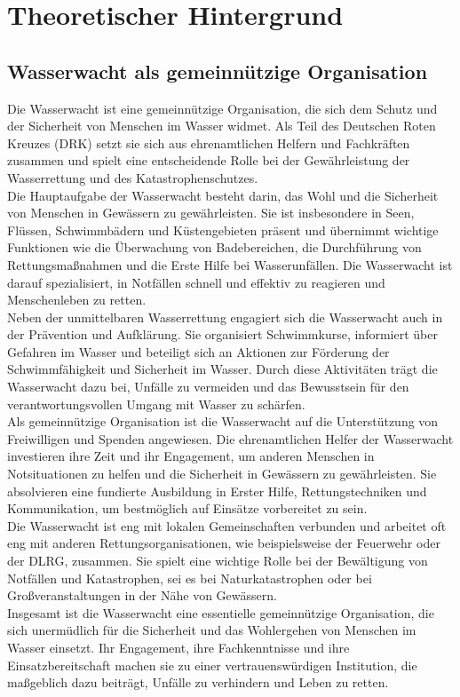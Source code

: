 \documentclass[fontsize=12pt,openright,oneside,paper=a4,BCOR=1cm]{scrbook}
\begin{document}
%
%

\chapter{Theoretischer Hintergrund}

\section{Wasserwacht als gemeinnützige Organisation}

Die Wasserwacht ist eine gemeinnützige Organisation, die sich dem Schutz und der Sicherheit von Menschen im Wasser widmet. Als Teil des Deutschen Roten Kreuzes (DRK) setzt sie sich aus ehrenamtlichen Helfern und Fachkräften zusammen und spielt eine entscheidende Rolle bei der Gewährleistung der Wasserrettung und des Katastrophenschutzes. \\
Die Hauptaufgabe der Wasserwacht besteht darin, das Wohl und die Sicherheit von Menschen in Gewässern zu gewährleisten. Sie ist insbesondere in Seen, Flüssen, Schwimmbädern und Küstengebieten präsent und übernimmt wichtige Funktionen wie die Überwachung von Badebereichen, die Durchführung von Rettungsmaßnahmen und die Erste Hilfe bei Wasserunfällen. Die Wasserwacht ist darauf spezialisiert, in Notfällen schnell und effektiv zu reagieren und Menschenleben zu retten. \\
Neben der unmittelbaren Wasserrettung engagiert sich die Wasserwacht auch in der Prävention und Aufklärung. Sie organisiert Schwimmkurse, informiert über Gefahren im Wasser und beteiligt sich an Aktionen zur Förderung der Schwimmfähigkeit und Sicherheit im Wasser. Durch diese Aktivitäten trägt die Wasserwacht dazu bei, Unfälle zu vermeiden und das Bewusstsein für den verantwortungsvollen Umgang mit Wasser zu schärfen. \\
Als gemeinnützige Organisation ist die Wasserwacht auf die Unterstützung von Freiwilligen und Spenden angewiesen. Die ehrenamtlichen Helfer der Wasserwacht investieren ihre Zeit und ihr Engagement, um anderen Menschen in Notsituationen zu helfen und die Sicherheit in Gewässern zu gewährleisten. Sie absolvieren eine fundierte Ausbildung in Erster Hilfe, Rettungstechniken und Kommunikation, um bestmöglich auf Einsätze vorbereitet zu sein. \\
Die Wasserwacht ist eng mit lokalen Gemeinschaften verbunden und arbeitet oft eng mit anderen Rettungsorganisationen, wie beispielsweise der Feuerwehr oder der DLRG, zusammen. Sie spielt eine wichtige Rolle bei der Bewältigung von Notfällen und Katastrophen, sei es bei Naturkatastrophen oder bei Großveranstaltungen in der Nähe von Gewässern. \\
Insgesamt ist die Wasserwacht eine essentielle gemeinnützige Organisation, die sich unermüdlich für die Sicherheit und das Wohlergehen von Menschen im Wasser einsetzt. Ihr Engagement, ihre Fachkenntnisse und ihre Einsatzbereitschaft machen sie zu einer vertrauenswürdigen Institution, die maßgeblich dazu beiträgt, Unfälle zu verhindern und Leben zu retten.
\end{document}
